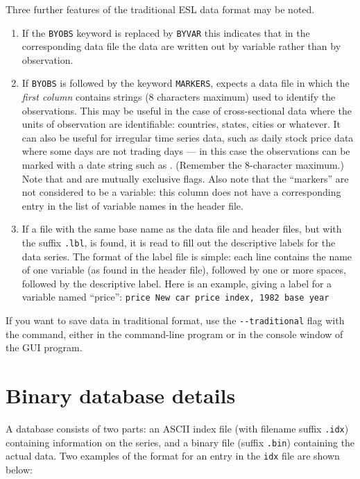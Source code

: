 Three further features of the traditional ESL data format may be
noted.
    
\begin{enumerate}
\item If the \verb+BYOBS+ keyword is replaced by \verb+BYVAR+ this
  indicates that in the corresponding data file the data are written
  out by variable rather than by observation.
\item If \verb+BYOBS+ is followed by the keyword \verb+MARKERS+,
   expects a data file in which the \emph{first column}
  contains strings (8 characters maximum) used to identify the
  observations.  This may be useful in the case of cross-sectional data
  where the units of observation are identifiable: countries, states,
  cities or whatever.  It can also be useful for irregular time series
  data, such as daily stock price data where some days are not trading
  days --- in this case the observations can be marked with a date
  string such as .  (Remember the 8-character maximum.)
  Note that  and  are mutually exclusive
  flags.  Also note that the ``markers'' are not considered to be a
  variable: this column does not have a corresponding entry in the
  list of variable names in the header file.
\item If a file with the same base name as the data file and header
  files, but with the suffix \verb+.lbl+, is found, it is read to fill
  out the descriptive labels for the data series. The format of the
  label file is simple: each line contains the name of one variable
  (as found in the header file), followed by one or more spaces,
  followed by the descriptive label. Here is an example, giving
  a label for a variable named ``price'':
  \verb+price New car price index, 1982 base year+
\end{enumerate}

If you want to save data in traditional format, use the
\verb|--traditional| flag with the  command, either in the
command-line program or in the console window of the GUI program.


\section{Binary database details}
\label{dbdetails}

A  database consists of two parts: an ASCII index file
(with filename suffix \verb+.idx+) containing information on the
series, and a binary file (suffix \verb+.bin+) containing the actual
data.  Two examples of the format for an entry in the \verb+idx+ file
are shown below:

